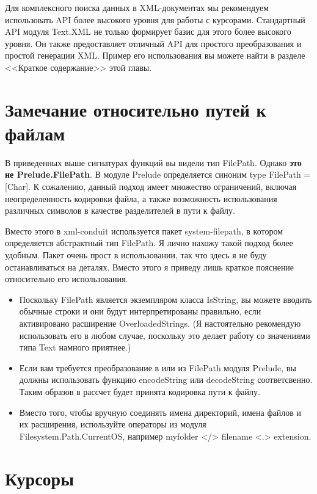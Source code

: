 Для комплексного поиска данных в XML-документах мы рекомендуем использовать API более высокого уровня для работы с курсорами. Стандартный API модуля Text.XML не только формирует базис для этого более высокого уровня. Он также предоставляет отличный API для простого преобразования и простой генерации XML. Пример его использования вы можете найти в разделе <<Краткое содержание>> этой главы.

\section{Замечание относительно путей к файлам} %

В приведенных выше сигнатурах функций вы видели тип FilePath. Однако {\bf это не Prelude.FilePath}. В модуле Prelude определяется синоним type FilePath = [Char]. К сожалению, данный подход имеет множество ограничений, включая неопределенность кодировки файла, а также возможность использования различных символов в качестве разделителей в пути к файлу.

Вместо этого в xml-conduit используется пакет system-filepath, в котором определяется абстрактный тип FilePath. Я лично нахожу такой подход более удобным. Пакет очень прост в использовании, так что здесь я не буду останавливаться на деталях. Вместо этого я приведу лишь краткое пояснение относительно его использования.

\begin{itemize}
\item Поскольку FilePath является экземпляром класса IsString, вы можете вводить обычные строки и они будут интерпретированы правильно, если активировано расширение OverloadedStrings. (Я настоятельно рекомендую использовать его в любом случае, поскольку это делает работу со значениями типа Text намного приятнее.)
\item Если вам требуется преобразование в или из FilePath модуля Prelude, вы должны использовать функцию encodeString или decodeString соответсвенно. Таким образов в рассчет будет принята кодировка пути к файлу.
\item Вместо того, чтобы вручную соединять имена директорий, имена файлов и их расширения, используйте операторы из модуля Filesystem.Path.CurrentOS, например myfolder </> filename <.> extension.
\end{itemize}
  
\section{Курсоры} %

